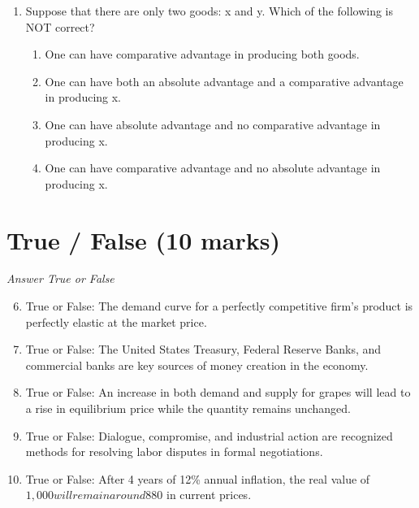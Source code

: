 \documentclass[12pt]{article}
\begin{document}
\begin{enumerate}[label=\arabic*.]
\begin{enumerate}[label=(\alph*)]
    \item decrease by \$200 million.
    \item decrease by \$100 million.
    \item increase by \$200 million.
    \item decrease by \$10 million.
    \item increase by \$500 million.
\end{enumerate}
\item Suppose that there are only two goods: x and y. Which of the following is NOT correct?
\begin{enumerate}[label=(\alph*)]
    \item One can have comparative advantage in producing both goods.
    \item One can have both an absolute advantage and a comparative advantage in producing x.
    \item One can have absolute advantage and no comparative advantage in producing x.
    \item One can have comparative advantage and no absolute advantage in producing x.
\end{enumerate}
\end{enumerate}

\section*{True / False (10 marks)}
\textit{Answer True or False}
\begin{enumerate}[label=\arabic*.]
\setcounter{enumi}{5}
\item True or False: The demand curve for a perfectly competitive firm's product is perfectly elastic at the market price.
\item True or False: The United States Treasury, Federal Reserve Banks, and commercial banks are key sources of money creation in the economy.
\item True or False: An increase in both demand and supply for grapes will lead to a rise in equilibrium price while the quantity remains unchanged.
\item True or False: Dialogue, compromise, and industrial action are recognized methods for resolving labor disputes in formal negotiations.
\item True or False: After 4 years of 12\% annual inflation, the real value of $1,000 will remain around $880 in current prices.
\end{enumerate}
\end{document}
